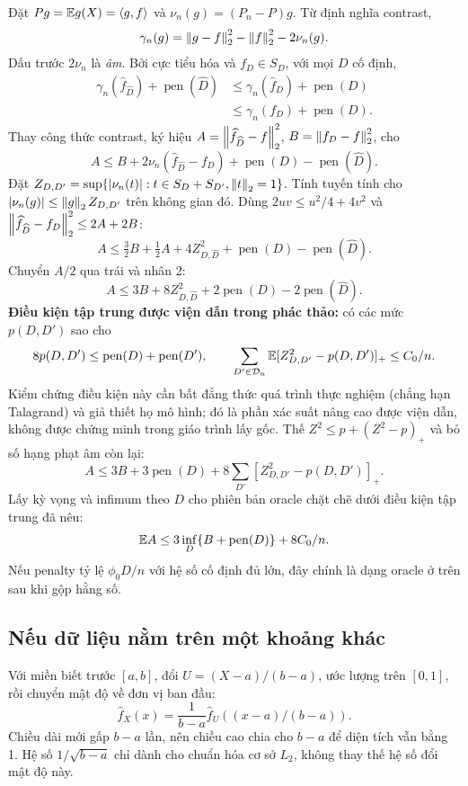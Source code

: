 Đặt $P g=\mathbb E g(X)=\left\langle g,f\right\rangle$ và $\nu_n(g)=(P_n-P)g$.
Từ định nghĩa contrast,
\[
\gamma_n(g)=\left\lVert g-f\right\rVert_2^2-\left\lVert f\right\rVert_2^2-2\nu_n(g).
\]
Dấu trước $2\nu_n$ là \emph{âm}. Bởi cực tiểu hóa và
$f_D\in S_D$, với mọi $D$ cố định,
\begin{align*}
\gamma_n(\widehat f_{\widehat D})+\operatorname{pen}(\widehat D)
&\leq\gamma_n(\widehat f_D)+\operatorname{pen}(D)\\
&\leq\gamma_n(f_D)+\operatorname{pen}(D).
\end{align*}
Thay công thức contrast, ký hiệu
$A=\left\lVert \widehat f_{\widehat D}-f\right\rVert_2^2$,
$B=\left\lVert f_D-f\right\rVert_2^2$, cho
\[
A\leq B+2\nu_n(\widehat f_{\widehat D}-f_D)
+\operatorname{pen}(D)-\operatorname{pen}(\widehat D).
\]
Đặt
$Z_{D,D'}=\sup\{|\nu_n(t)|:t\in S_D+S_{D'},\left\lVert t\right\rVert_2=1\}$.
Tính tuyến tính cho $|\nu_n(g)|\leq\left\lVert g\right\rVert_2 Z_{D,D'}$ trên không gian
đó. Dùng $2uv\leq u^2/4+4v^2$ và
$\left\lVert \widehat f_{\widehat D}-f_D\right\rVert_2^2\leq2A+2B$:
\[
A\leq\tfrac32B+\tfrac12A+4Z_{D,\widehat D}^2
+\operatorname{pen}(D)-\operatorname{pen}(\widehat D).
\]
Chuyển $A/2$ qua trái và nhân 2:
\[
A\leq3B+8Z_{D,\widehat D}^2
+2\operatorname{pen}(D)-2\operatorname{pen}(\widehat D).
\]
\textbf{Điều kiện tập trung được viện dẫn trong phác thảo:}
có các mức $p(D,D')$ sao cho
\[
8p(D,D')\leq\operatorname{pen}(D)+\operatorname{pen}(D'),\qquad
\sum_{D'\in\mathcal D_n}\mathbb E[Z_{D,D'}^2-p(D,D')]_+\leq C_0/n.
\]
Kiểm chứng điều kiện này cần bất đẳng thức quá trình thực nghiệm
(chẳng hạn Talagrand) và giả thiết họ mô hình; đó là phần xác suất nâng
cao được viện dẫn, không được chứng minh trong giáo trình lấy gốc.
Thế $Z^2\leq p+(Z^2-p)_+$ và bỏ số hạng phạt âm còn lại:
\[
A\leq3B+3\operatorname{pen}(D)
+8\sum_{D'}[Z_{D,D'}^2-p(D,D')]_+.
\]
Lấy kỳ vọng và infimum theo $D$ cho phiên bản oracle chặt chẽ dưới điều
kiện tập trung đã nêu:
\[
\mathbb E A\leq3\inf_D\{B+\operatorname{pen}(D)\}+8C_0/n.
\]
Nếu penalty tỷ lệ $\phi_0D/n$ với hệ số cố định đủ lớn, đây chính là
dạng oracle ở trên sau khi gộp hằng số.



\subsection{Nếu dữ liệu nằm trên một khoảng khác}
Với miền biết trước $[a,b]$, đổi $U=(X-a)/(b-a)$, ước lượng trên
$[0,1]$, rồi chuyển mật độ về đơn vị ban đầu:
\[
\widehat f_X(x)=\frac1{b-a}\widehat f_U((x-a)/(b-a)).
\]
Chiều dài mới gấp $b-a$ lần, nên chiều cao chia cho $b-a$ để diện tích
vẫn bằng 1. Hệ số $1/\sqrt{b-a}$ chỉ dành cho chuẩn hóa cơ sở $L_2$,
không thay thế hệ số đổi mật độ này.
